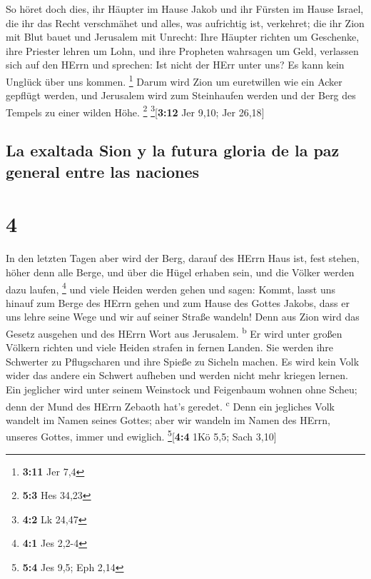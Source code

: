  So höret doch dies, ihr Häupter im Hause Jakob und ihr
Fürsten im Hause Israel, die ihr das Recht verschmähet und alles, was
aufrichtig ist, verkehret;  die ihr Zion mit Blut bauet
und Jerusalem mit Unrecht:  Ihre Häupter richten um
Geschenke, ihre Priester lehren um Lohn, und ihre Propheten wahrsagen um
Geld, verlassen sich auf den HErrn und sprechen: Ist nicht der HErr
unter uns? Es kann kein Unglück über uns kommen. \footnote{\textbf{3:11}
  Jer 7,4}  Darum wird Zion um euretwillen wie ein Acker
gepflügt werden, und Jerusalem wird zum Steinhaufen werden und der Berg
des Tempels zu einer wilden Höhe. \footnote{\textbf{5:3} Hes 34,23}
\footnote{\textbf{4:2} Lk 24,47}{[}\textbf{3:12} Jer 9,10; Jer 26,18{]}

\hypertarget{la-exaltada-sion-y-la-futura-gloria-de-la-paz-general-entre-las-naciones}{%
\subsection{La exaltada Sion y la futura gloria de la paz general entre
las
naciones}\label{la-exaltada-sion-y-la-futura-gloria-de-la-paz-general-entre-las-naciones}}

\hypertarget{section-3}{%
\section{4}\label{section-3}}

 In den letzten Tagen aber wird der Berg, darauf des HErrn
Haus ist, fest stehen, höher denn alle Berge, und über die Hügel erhaben
sein, und die Völker werden dazu laufen, \footnote{\textbf{4:1} Jes
  2,2-4}  und viele Heiden werden gehen und sagen: Kommt,
lasst uns hinauf zum Berge des HErrn gehen und zum Hause des Gottes
Jakobs, dass er uns lehre seine Wege und wir auf seiner Straße wandeln!
Denn aus Zion wird das Gesetz ausgehen und des HErrn Wort aus Jerusalem.
\textsuperscript{b}  Er wird unter großen Völkern richten
und viele Heiden strafen in fernen Landen. Sie werden ihre Schwerter zu
Pflugscharen und ihre Spieße zu Sicheln machen. Es wird kein Volk wider
das andere ein Schwert aufheben und werden nicht mehr kriegen lernen.
 Ein jeglicher wird unter seinem Weinstock und Feigenbaum
wohnen ohne Scheu; denn der Mund des HErrn Zebaoth hat's geredet.
\textsuperscript{c}  Denn ein jegliches Volk wandelt im
Namen seines Gottes; aber wir wandeln im Namen des HErrn, unseres
Gottes, immer und ewiglich. \footnote{\textbf{5:4} Jes 9,5; Eph 2,14}{[}\textbf{4:4}
1Kö 5,5; Sach 3,10{]}

